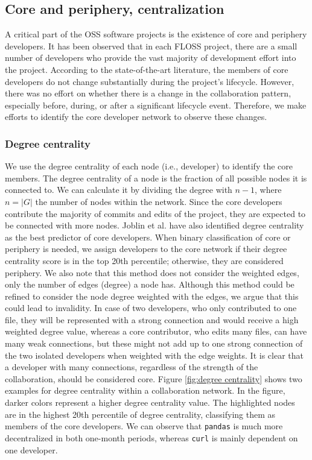 \subsection{Core and periphery, centralization}
A critical part of the OSS software projects is the existence of core and periphery developers. It has been observed that in each FLOSS project, there are a small number of developers who provide the vast majority of development effort into the project. According to the state-of-the-art literature, the members of core developers do not change substantially during the project's lifecycle. However, there was no effort on whether there is a change in the collaboration pattern, especially before, during, or after a significant lifecycle event. Therefore, we make efforts to identify the core developer network to observe these changes.

\subsubsection{Degree centrality}
\label{sec:deg_centrality}

We use the degree centrality of each node (i.e., developer) to identify the core members. The degree centrality of a node is the fraction of all possible nodes it is connected to. We can calculate it by dividing the degree with $n-1$, where $n = |G|$ the number of nodes within the network. Since the core developers contribute the majority of commits and edits of the project, they are expected to be connected with more nodes. Joblin et al. \cite{joblinClassifyingDevelopersCore2016, joblinEvolutionaryTrendsDeveloper2017} have also identified degree centrality as the best predictor of core developers. When binary classification of core or periphery is needed, we assign developers to the core network if their degree centrality score is in the top 20th percentile; otherwise, they are considered periphery. We also note that this method does not consider the weighted edges, only the number of edges (degree) a node has. Although this method could be refined to consider the node degree weighted with the edges, we argue that this could lead to invalidity. In case of two developers, who only contributed to one file, they will be represented with a strong connection and would receive a high weighted degree value, whereas a core contributor, who edits many files, can have many weak connections, but these might not add up to one strong connection of the two isolated developers when weighted with the edge weights. It is clear that a developer with many connections, regardless of the strength of the collaboration, should be considered core. Figure \ref{fig:degree centrality} shows two examples for degree centrality within a collaboration network. In the figure, darker colors represent a higher degree centrality value. The highlighted nodes are in the highest 20th percentile of degree centrality, classifying them as members of the core developers. We can observe that \texttt{pandas} is much more decentralized in both one-month periods, whereas \texttt{curl} is mainly dependent on one developer.

